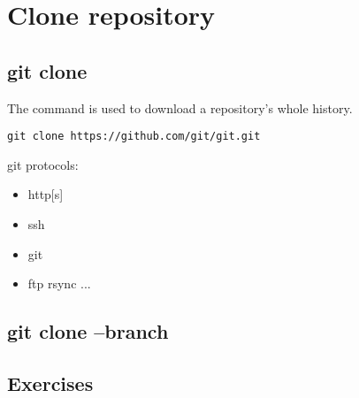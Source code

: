 \section{Clone repository}
\begin{frame}[fragile]
    \slidetitle
\end{frame}

\subsection{git clone}
\begin{frame}[fragile]
  \subslidetitle
  The command  is used to download a repository's whole history.
  \begin{lstlisting}
git clone https://github.com/git/git.git
  \end{lstlisting}

git protocols:
\begin{itemize}
\item http[s]
\item ssh
\item git
\item ftp rsync ...
\end{itemize}
\end{frame}

\subsection{git clone --branch}
\begin{frame}[fragile]
  \subslidetitle
\end{frame}

\subsection{Exercises}
\begin{frame}[fragile]
  \subslidetitle
\end{frame}
